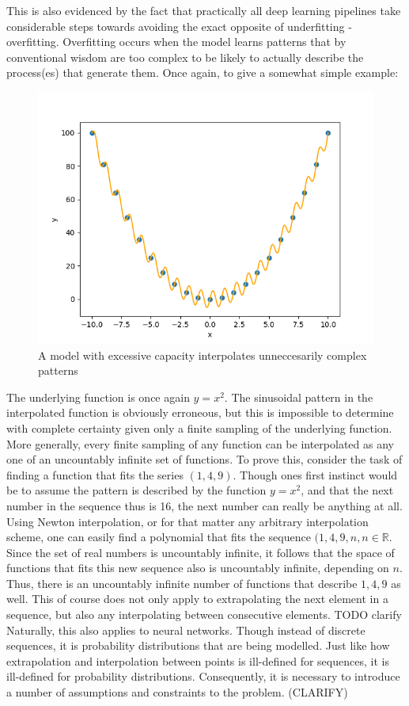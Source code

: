 		This is also evidenced by the fact that practically all deep learning pipelines take considerable steps towards avoiding the exact opposite of underfitting - overfitting. Overfitting occurs when the model learns patterns that by conventional wisdom are too complex to be likely to actually describe the process(es) that generate them. Once again, to give a somewhat simple example: 
		\begin{figure}[h]
			\includegraphics[width=\linewidth]{illustrations/overfit.png}
			\caption{A model with excessive capacity interpolates unneccesarily complex patterns}
			\label{Overfit example}
		\end{figure}
		The underlying function is once again \(y=x^2\). The sinusoidal pattern in the interpolated function is obviously erroneous, but this is impossible to determine with complete certainty given only a finite sampling of the underlying function. More generally, every finite sampling of any function can be interpolated as any one of an uncountably infinite set of functions. To prove this, consider the task of finding a function that fits the series \((1,4,9)\). Though ones first instinct would be to assume the pattern is described by the function \(y=x^2\), and that the next number in the sequence thus is 16, the next number can really be anything at all. Using Newton interpolation, or for that matter any arbitrary interpolation scheme, one can easily find a polynomial that fits the sequence \((1,4,9,n, n \in \mathbb{R}\). Since the set of real numbers is uncountably infinite, it follows that the space of functions that fits this new sequence also is uncountably infinite, depending on \(n\). Thus, there is an uncountably infinite number of functions that describe \(1,4,9\) as well. This of course does not only apply to extrapolating the next element in a sequence, but also any interpolating between consecutive elements. TODO clarify
		Naturally, this also applies to neural networks. Though instead of discrete sequences, it is probability distributions that are being modelled. Just like how extrapolation and interpolation between points is ill-defined for sequences, it is ill-defined for probability distributions. Consequently, it is necessary to introduce a number of assumptions and constraints to the problem. (CLARIFY)
		
